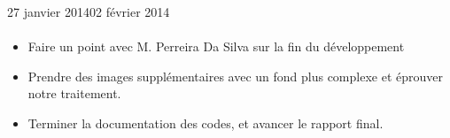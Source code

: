 \documentclass[11pt, french,screen]{report-rd-info}
\begin{document}
\begin{fichesuivi}{27 janvier 2014}{02 février 2014}
\paragraph*{}
	\begin{planification}
		\begin{itemize}
			\item Faire un point avec M. Perreira Da Silva sur la fin du développement
			\item Prendre des images supplémentaires avec un fond plus complexe et éprouver notre traitement.
			\item Terminer la documentation des codes, et avancer le rapport final.
\end{itemize}
	\end{planification}
\end{fichesuivi}
\end{document}
